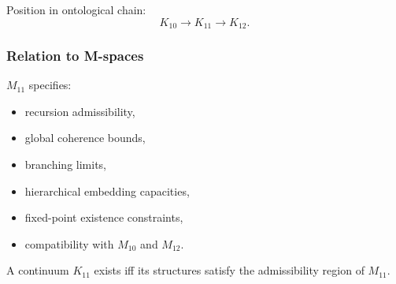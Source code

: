 Position in ontological chain:
\[
K_{10} \to K_{11} \to K_{12}.
\]

\subsubsection{Relation to M-spaces}

$M_{11}$ specifies:
\begin{itemize}
    \item recursion admissibility,
    \item global coherence bounds,
    \item branching limits,
    \item hierarchical embedding capacities,
    \item fixed-point existence constraints,
    \item compatibility with $M_{10}$ and $M_{12}$.
\end{itemize}

A continuum $K_{11}$ exists iff its structures satisfy the admissibility region of $M_{11}$.

